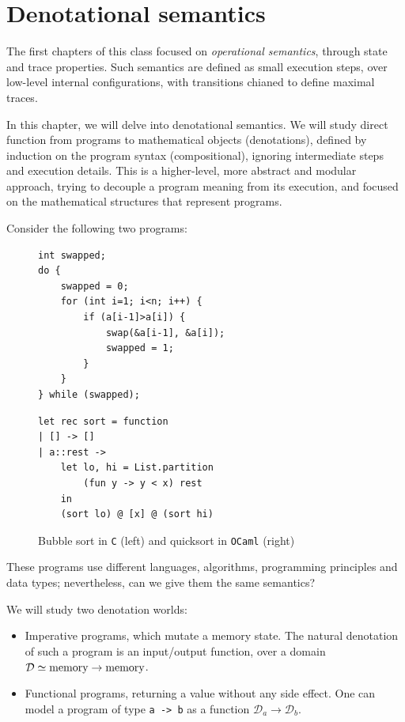 \documentclass[toc]{../cs-classes/cs-classes}
\begin{document}
\section{Denotational semantics}
The first chapters of this class focused on \emph{operational semantics}, through state and trace properties. Such semantics are defined as small execution steps, over low-level internal configurations, with transitions chianed to define maximal traces.

In this chapter, we will delve into denotational semantics. We will study direct function from programs to mathematical objects (denotations), defined by induction on the program syntax (compositional), ignoring intermediate steps and execution details. This is a higher-level, more abstract and modular approach, trying to decouple a program meaning from its execution, and focused on the mathematical structures that represent programs.

Consider the following two programs:
\begin{figure}[H]
    \centering
    \begin{minipage}{0.49\textwidth}
        \centering
        \begin{verbatim}
int swapped;
do {
    swapped = 0;
    for (int i=1; i<n; i++) {
        if (a[i-1]>a[i]) {
            swap(&a[i-1], &a[i]);
            swapped = 1;
        }
    }
} while (swapped);
        \end{verbatim}
    \end{minipage}
    \begin{minipage}{.49\textwidth}
        \begin{verbatim}
let rec sort = function
| [] -> []
| a::rest ->
    let lo, hi = List.partition 
        (fun y -> y < x) rest
    in
    (sort lo) @ [x] @ (sort hi)
        \end{verbatim}
    \end{minipage}
    \caption{Bubble sort in \texttt{C} (left) and quicksort in \texttt{OCaml} (right)}
\end{figure}
These programs use different languages, algorithms, programming principles and data types; nevertheless, can we give them the same semantics?

We will study two denotation worlds:
\begin{itemize}
    \item Imperative programs, which mutate a memory state. The natural denotation of such a program is an input/output function, over a domain $\mathcal{D} \simeq \textnormal{memory} \rightarrow \textnormal{memory}$.
    \item Functional programs, returning a value without any side effect. One can model a program of type \texttt{a -> b} as a function $\mathcal{D}_a \rightarrow \mathcal{D}_b$.
\end{itemize}
\end{document}
